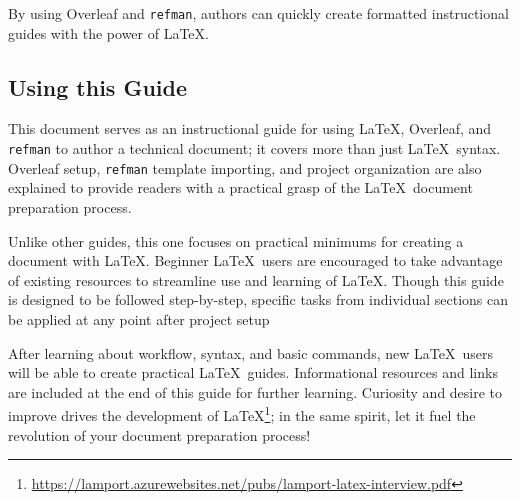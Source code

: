 By using Overleaf and \texttt{refman}, authors can quickly create formatted instructional guides with the power of \LaTeX.

\subsection{Using this Guide}
This document serves as an instructional guide for using \LaTeX, Overleaf, and \texttt{refman} to author a technical document; it covers more than just \LaTeX\ syntax. Overleaf setup, \texttt{refman} template importing, and project organization are also explained to provide readers with a practical grasp of the \LaTeX\ document preparation process. 
\par
Unlike other guides, this one focuses on practical minimums for creating a document with \LaTeX. Beginner \LaTeX\ users are encouraged to take advantage of existing resources to streamline use and learning of \LaTeX. Though this guide is designed to be followed step-by-step, specific tasks from individual sections can be applied at any point after project setup
\par
 After learning about workflow, syntax, and basic commands, new \LaTeX\ users will be able to create practical \LaTeX\ guides. Informational resources and links are included at the end of this guide for further learning. Curiosity and desire to improve drives the development of \LaTeX\footnote{\url{https://lamport.azurewebsites.net/pubs/lamport-latex-interview.pdf}}; in the same spirit, let it fuel the revolution of your document preparation process!
\par


